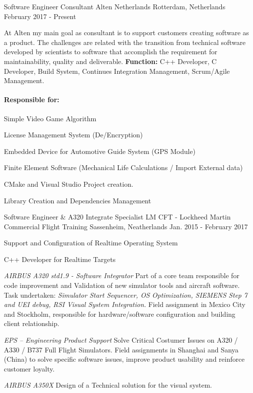 \begin{cventries}
  \cventry
    {Software Engineer Consultant}
    {Alten Netherlands}
    {Rotterdam, Netherlands}
    {February 2017 - Present}
    {          
    At Alten my main goal as consultant is to support customers creating software as a product. The challenges are related with the transition from technical software developed by scientists  to software that accomplish the requirement for maintainability, quality and deliverable. \textbf{Function:} C++ Developer, C Developer, Build System, Continues Integration Management, Scrum/Agile Management.
\paragraph{Responsible for:}
       \begin{cvitems}     
       \item Simple Video Game Algorithm
       \item License Management System (De/Encryption)
       \item Embedded Device for Automotive Guide System (GPS Module)
       \item Finite Element Software (Mechanical Life Calculations / Import External data)
       \item CMake and Visual Studio Project creation.
       \item Library Creation and Dependencies Management
       \end{cvitems}
    }

  \cventry
    {Software Engineer \& A320 Integrate Specialist}
    {LM CFT - Lockheed Martin Commercial Flight Training}
    {Sassenheim, Neatherlands}
    {Jan. 2015 - February 2017}
    {          
      \begin{cvitems}     
      \item{Support and Configuration of Realtime Operating System}
      \item{C++ Developer for Realtime Targets }
      \item {\textit{ AIRBUS A320 std1.9 - Software Integrator} Part of a core team responsible for code improvement and Validation of new simulator tools and aircraft software. Task undertaken: \textit{Simulator Start Sequencer, OS Optimization, SIEMENS Step 7 and  UEI debug, RSI Visual System Integration.} 
      Field assignment in Mexico City and Stockholm, responsible for hardware/software configuration and building client relationship.}
    \item {\textit{EPS – Engineering Product Support} Solve Critical Costumer  Issues on A320 / A330 / B737 Full Flight Simulators. Field assignments in Shanghai and Sanya (China) to  solve specific software issues, improve product usability and reinforce customer loyalty.}
       \item {\textit{AIRBUS A350X}  Design of a Technical solution for the visual system.}
       \end{cvitems}
    }



\end{cventries}
